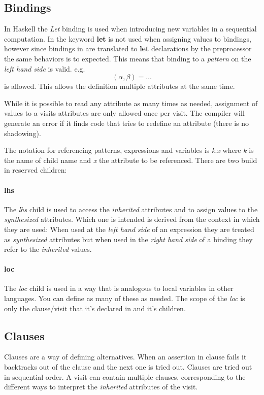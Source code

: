 \subsection{Bindings}
\label{bindings}
In Haskell the \emph{Let} binding is used when introducing new variables in a sequential computation. In \rcore the keyword \textbf{let} is not used when assigning values to bindings, however since bindings in \rcore are translated to \textbf{let} declarations by the preprocessor the same behaviors is to expected. This means that binding to a \emph{pattern} on the \emph{left hand side} is valid. e.g. \[ (\alpha, \beta) = \ldots \] is allowed. This allows the definition multiple attributes at the same time.

While it is possible to read any attribute as many times as needed, assignment of values to a visits attributes are only allowed once per visit. The compiler will generate an error if it finds code that tries to redefine an attribute (there is no shadowing).

The notation for referencing patterns, expressions and variables is \emph{k}.\emph{x} where \emph{k} is the name of child name and \emph{x} the attribute to be referenced. There are two build in reserved children:

\paragraph{lhs}
The \emph{lhs} child is used to access the \emph{inherited} attributes and to assign values to the \emph{synthesized} attributes. Which one is intended is derived from the context in which they are used: When used at the \emph{left hand side} of an expression they are treated as \emph{synthesized} attributes but when used in the \emph{right hand side} of a binding they refer to the \emph{inherited} values.
 
\paragraph{loc}
The \emph{loc} child is used in a way that is analogous to local variables in other languages. You can define as many of these as needed. The scope of the \emph{loc} is only the clause/visit that it's declared in and it's children.


\subsection{Clauses}
Clauses are a way of defining alternatives. When an assertion in clause fails  it backtracks out of the clause and the next one is tried out. Clauses are tried out in sequential order. A visit can contain multiple clauses, corresponding to the different ways to interpret the \emph{inherited} attributes of the visit.

